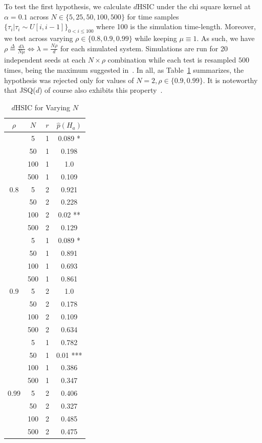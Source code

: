 To test the first hypothesis, we calculate $d$HSIC under the chi square kernel at $\alpha = 0.1$ across $N \in \{5, 25, 50, 100, 500\}$
for time samples $\{\tau_{i} | \tau_{i} \sim U[i,i-1]\}_{0 < i \leq 100}$ where 100 is the simulation time-length.
Moreover, we test across varying $\rho \in \{0.8, 0.9, 0.99\}$ while keeping $\mu \equiv 1$.
As such, we have $\rho \overset{\Delta}= \frac{d\lambda}{N\mu} \iff \lambda = \frac{N \rho}{d}$ for each simulated system.
Simulations are run for 20 independent seeds at each $N\times\rho$ combination while each test is resampled $500$ times, being the maximum suggested in~\cite{jointindep}.
In all, as Table~\ref{tab:reg} summarizes, the hypothesis was rejected only for values of $N = 2, \rho \in \{0.9,0.99\}$.
It is noteworthy that JSQ($d$) of course also exhibits this property~\cite{bramson_asymptotic_2012}.
\begin{table}
    \centering
    \caption{$d$HSIC for Varying $N$}
    \label{tab:reg}
    \begin{tabular}{|c|c|c|c|}
        \hline
        $\rho$ & $N$ & $r$ & $\hat p(H_{a})$ \\
        \hline
        \hline
        & 5   & 1   & 0.089 *         \\
        & 50  & 1   & 0.198           \\
        & 100 & 1   & 1.0             \\
        & 500 & 1   & 0.109           \\
        0.8    & 5   & 2   & 0.921           \\
        & 50  & 2   & 0.228           \\
        & 100 & 2   & 0.02 **         \\
        & 500 & 2   & 0.129           \\
        \hline
        & 5   & 1   & 0.089 *         \\
        & 50  & 1   & 0.891           \\
        & 100 & 1   & 0.693           \\
        & 500 & 1   & 0.861           \\
        0.9    & 5   & 2   & 1.0             \\
        & 50  & 2   & 0.178           \\
        & 100 & 2   & 0.109           \\
        & 500 & 2   & 0.634           \\
        \hline

        & 5   & 1   & 0.782           \\
        & 50  & 1   & 0.01 ***        \\
        & 100 & 1   & 0.386           \\
        & 500 & 1   & 0.347           \\
        0.99   & 5   & 2   & 0.406           \\
        & 50  & 2   & 0.327           \\
        & 100 & 2   & 0.485           \\
        & 500 & 2   & 0.475           \\
        \hline



\end{tabular}
\end{table}
